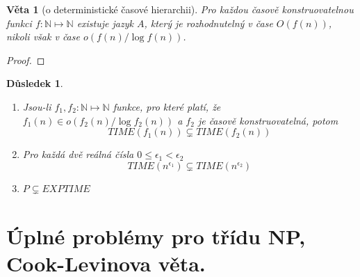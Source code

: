 \documentclass[11pt]{report} %
\newcommand{\N}{\mathbb{N}}
\newtheorem{theorem}{Věta}[section]
\newtheorem{implication}{Důsledek}[section]
\begin{document}
\begin{theorem}[o deterministické časové hierarchii] Pro každou časově konstruovatelnou funkci $f : \N \mapsto \N$ existuje jazyk $A$, který je rozhodnutelný v čase $O(f(n))$, nikoli však v čase $o(f(n)/\log f(n))$.
\end{theorem}

\begin{proof}
\end{proof}

\begin{implication}~
	\begin{enumerate}
		\item Jsou-li $f_1, f_2 : \N \mapsto \N$ funkce, pro které platí, že $f_1(n) \in o(f_2(n)/ \log f_2(n))$ a $f_2$ je časově konstruovatelná, potom
			$$TIME(f_1(n)) \subsetneq TIME(f_2(n))$$
		\item Pro každá dvě reálná čísla $0 \leq \epsilon_1 < \epsilon_2$
			$$TIME(n^{\epsilon_1}) \subsetneq TIME(n^{\epsilon_2})$$
		\item $P \subsetneq EXPTIME$
	\end{enumerate}
\end{implication}

\section{Úplné problémy pro třídu NP, Cook-Levinova věta.}
\end{document}
